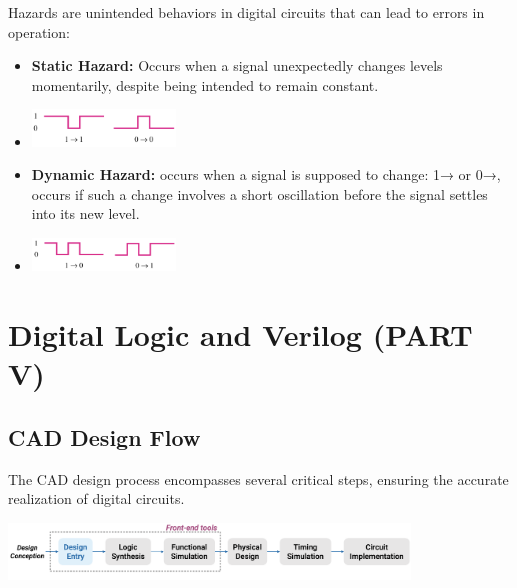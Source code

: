 \documentclass[12pt,openany, tikz,border=10pt]{book}
\begin{document}
Hazards are unintended behaviors in digital circuits that can lead to errors in operation:
\begin{itemize}
    \item[] \textbf{Static Hazard:} Occurs when a signal unexpectedly changes levels momentarily, despite being intended to remain constant.
    \item[] 
        \centering
        \includegraphics[width=0.3\textwidth]{circuits/9.5.png}
       
        
    \item[] \textbf{Dynamic Hazard:} occurs
    when a signal is supposed to
    change: 1\;→ or 0\;→, occurs if such a change
    involves a short oscillation before
    the signal settles into its new level.
    \item[] 
        \centering
        \includegraphics[width=0.3\textwidth]{circuits/9.5_1.png}
\end{itemize}

\chapter{Digital Logic and Verilog (PART V)}

\section{CAD Design Flow}
The CAD design process encompasses several critical steps, ensuring the accurate realization of digital circuits. 

    \centering
    \includegraphics[width=0.8\textwidth]{circuits/10.1.png}
\end{document}
